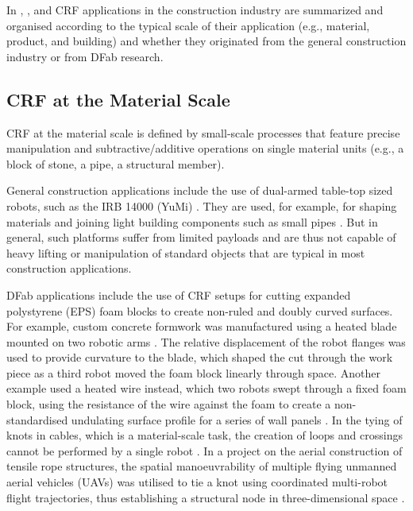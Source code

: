     In , , and  CRF applications in the construction industry are summarized and organised according to the typical scale of their application (e.g., material, product, and building) and whether they originated from the general construction industry or from DFab research.

    
\subsection{CRF at the Material Scale} \label{sec:2_material}
    CRF at the material scale is defined by small-scale processes that feature precise manipulation and subtractive/additive operations on single material units (e.g., a block of stone, a pipe, a structural member).
    
    General construction applications include the use of dual-armed table-top sized robots, such as the IRB 14000 (YuMi) \citep{abb_product_2015}. 
    They are used, for example, for shaping materials and joining light building components such as small pipes \citep{afsari_applications_2018}. But in general, such platforms suffer from limited payloads and are thus not capable of heavy lifting or manipulation of standard objects that are typical in most construction applications. 
    
    DFab applications include the use of CRF setups for cutting expanded polystyrene (EPS) foam blocks to create non-ruled and doubly curved surfaces. For example, custom concrete formwork was manufactured using a heated blade mounted on two robotic arms \citep{sondergaard_robotic_2016}. The relative displacement of the robot flanges was used to provide curvature to the blade, which shaped the cut through the work piece as a third robot moved the foam block linearly through space. Another example used a heated wire instead, which two robots swept through a fixed foam block, using the resistance of the wire against the foam to create a non-standardised undulating surface profile for a series of wall panels \citep{rust_spatial_2016}. In the tying of knots in cables, which is a material-scale task, the creation of loops and crossings cannot be performed by a single robot \citep{augugliaro_knot-tying_2015}. In a project on the aerial construction of tensile rope structures, the spatial manoeuvrability of multiple flying unmanned aerial vehicles (UAVs) was utilised to tie a knot using coordinated multi-robot flight trajectories, thus establishing a structural node in three-dimensional space \citep{mirjan_building_2014,augugliaro_building_2013}.
    
